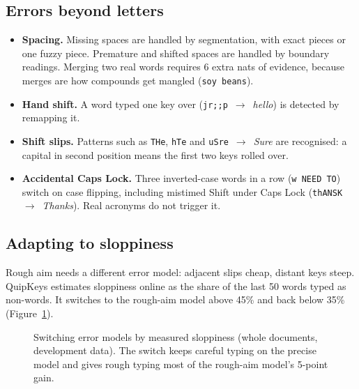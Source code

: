 \documentclass[11pt,a4paper]{article}
\newcommand{\qk}{QuipKeys}
\newcommand{\ttw}[1]{\texttt{#1}}
\begin{document}
\subsection{Errors beyond letters}
\label{sec:special}
\begin{itemize}
\item \textbf{Spacing.} Missing spaces are handled by segmentation, with exact pieces or one fuzzy piece. Premature and shifted spaces are handled by boundary readings. Merging two real words requires 6 extra nats of evidence, because merges are how compounds get mangled (\ttw{soy beans}).
\item \textbf{Hand shift.} A word typed one key over (\ttw{jr;;p}~$\to$~\emph{hello}) is detected by remapping it.
\item \textbf{Shift slips.} Patterns such as \ttw{THe}, \ttw{hTe} and \ttw{uSre}~$\to$~\emph{Sure} are recognised: a capital in second position means the first two keys rolled over.
\item \textbf{Accidental Caps Lock.} Three inverted-case words in a row (\ttw{w NEED TO}) switch on case flipping, including mistimed Shift under Caps Lock (\ttw{thANSK}~$\to$~\emph{Thanks}). Real acronyms do not trigger it.
\end{itemize}

\subsection{Adapting to sloppiness}
Rough aim needs a different error model: adjacent slips cheap, distant keys steep. \qk{} estimates sloppiness online as the share of the last 50 words typed as non-words. It switches to the rough-aim model above 45\% and back below 35\% (Figure~\ref{fig:sloppy}).

\begin{figure}[t]
\centering
{}
\caption{Switching error models by measured sloppiness (whole documents, development data). The switch keeps careful typing on the precise model and gives rough typing most of the rough-aim model's 5-point gain.}
\label{fig:sloppy}
\end{figure}
\end{document}
